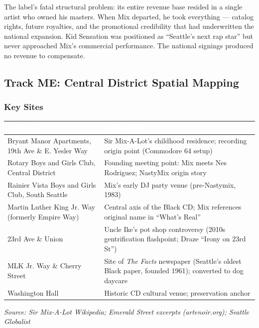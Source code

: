 \documentclass[11pt,letterpaper]{article}
\newcommand{\tableheader}[1]{\textbf{\sffamily\textcolor{white}{#1}}}
\begin{document}
The label's fatal structural problem: its entire revenue base resided in a single artist who owned
his masters. When Mix departed, he took everything --- catalog rights, future royalties, and the
promotional credibility that had underwritten the national expansion. Kid Sensation was positioned
as ``Seattle's next rap star'' but never approached Mix's commercial performance. The national
signings produced no revenue to compensate.

\subsection{Track ME: Central District Spatial Mapping}

\subsubsection{Key Sites}

\begin{center}
\begin{tabularx}{\textwidth}{L{4.5cm}X}
\toprule
{}
\tableheader{Location} & \tableheader{Significance} \\
\midrule
Bryant Manor Apartments, 19th Ave \& E. Yesler Way & Sir Mix-A-Lot's childhood residence; recording origin point (Commodore 64 setup) \\
Rotary Boys and Girls Club, Central District & Founding meeting point: Mix meets Nes Rodriguez; NastyMix origin story \\
Rainier Vista Boys and Girls Club, South Seattle & Mix's early DJ party venue (pre-Nastymix, 1983) \\
Martin Luther King Jr. Way (formerly Empire Way) & Central axis of the Black CD; Mix references original name in ``What's Real'' \\
23rd Ave \& Union & Uncle Ike's pot shop controversy (2010s gentrification flashpoint; Draze ``Irony on 23rd St'') \\
MLK Jr. Way \& Cherry Street & Site of \textit{The Facts} newspaper (Seattle's oldest Black paper, founded 1961); converted to dog daycare \\
Washington Hall & Historic CD cultural venue; preservation anchor \\
\bottomrule
\end{tabularx}
\end{center}

\textit{Source: Sir Mix-A-Lot Wikipedia; Emerald Street excerpts (artenoir.org); Seattle Globalist}
\end{document}
